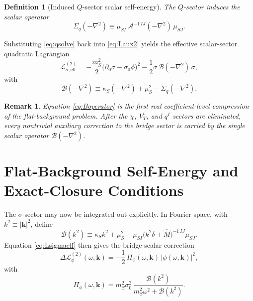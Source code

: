 \documentclass[11pt]{article}
\newtheorem{definition}{Definition}
\newtheorem{remark}{Remark}
\begin{document}
\begin{definition}[Induced \(Q\)-sector scalar self-energy]
The \(Q\)-sector induces the scalar operator
\begin{equation}
\Sigma_q(-\nabla^2)
\equiv
\mu_{SI}\,\mathcal A^{-1\,IJ}(-\nabla^2)\,\mu_{SJ}.
\label{eq:Sigmaq}
\end{equation}
\end{definition}

Substituting \eqref{eq:qsolve} back into \eqref{eq:Laux2} yields the effective scalar-sector quadratic Lagrangian
\begin{equation}
\mathcal L_{\sigma,\mathrm{eff}}^{(2)}
=
-\frac{m_S^2}{2}\bigl(\partial_0\sigma-\sigma_0\phi\bigr)^2
-\frac{1}{2}\sigma\,\mathcal B(-\nabla^2)\,\sigma,
\label{eq:Lsigmaeff}
\end{equation}
with
\begin{equation}
\mathcal B(-\nabla^2)
\equiv
\kappa_S(-\nabla^2)
+\mu_S^2
-\Sigma_q(-\nabla^2).
\label{eq:Boperator}
\end{equation}

\begin{remark}
Equation \eqref{eq:Boperator} is the first real coefficient-level compression of the flat-background problem. After the \(\chi\), \(V_T^i\), and \(q^I\) sectors are eliminated, every nontrivial auxiliary correction to the bridge sector is carried by the single scalar operator \(\mathcal B(-\nabla^2)\).
\end{remark}

\section{Flat-Background Self-Energy and Exact-Closure Conditions}

The \(\sigma\)-sector may now be integrated out explicitly. In Fourier space, with \(k^2\equiv |\mathbf{k}|^2\), define
\begin{equation}
\mathcal B(k^2)
\equiv
\kappa_Sk^2
+\mu_S^2
-\mu_{SI}\bigl(k^2\delta+\widehat M\bigr)^{-1\,IJ}\mu_{SJ}.
\label{eq:Bk}
\end{equation}
Equation \eqref{eq:Lsigmaeff} then gives the bridge-scalar correction
\begin{equation}
\Delta\mathcal L_{\phi}^{(2)}(\omega,\mathbf{k})
=
-\frac{1}{2}\,
\Pi_\phi(\omega,\mathbf{k})\,|\phi(\omega,\mathbf{k})|^2,
\label{eq:Deltaphi}
\end{equation}
with
\begin{equation}
\Pi_\phi(\omega,\mathbf{k})
=
m_S^2\sigma_0^2\,
\frac{\mathcal B(k^2)}{m_S^2\omega^2+\mathcal B(k^2)}.
\label{eq:Piphi}
\end{equation}
\end{document}
